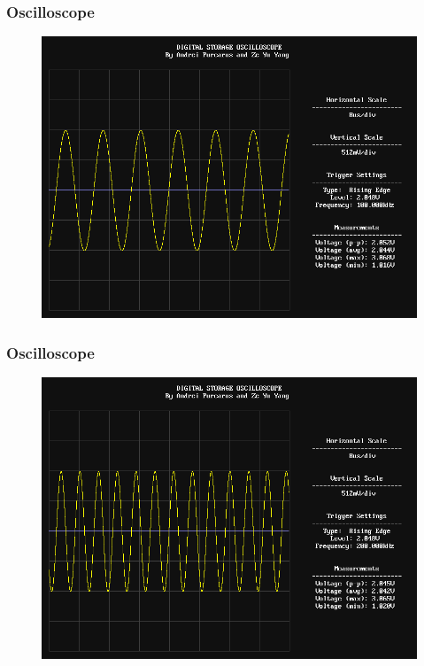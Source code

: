 \documentclass[pdf]{beamer}
\begin{document}
\begin{frame}
\frametitle{Oscilloscope}
\begin{figure}[!htb]
  \includegraphics[height=0.8\textheight]{test-results/scope_demo_100kHz.png}
\end{figure}
\end{frame}

\begin{frame}
\frametitle{Oscilloscope}
\begin{figure}[!htb]
  \includegraphics[height=0.8\textheight]{test-results/scope_demo_200kHz.png}
\end{figure}
\end{frame}
\end{document}
